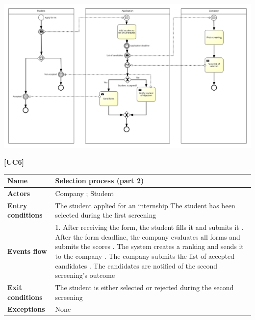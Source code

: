 \documentclass[11pt,twoside]{article}
\begin{document}
\begin{center}
\includegraphics[width=\textwidth]{Images/UC5}
\end{center}

\newpage

\large{\textbf{[UC6]}} \\
\begin{table}[H]
\begin{tabular}{| p{} | p{} |}
\hline
\textbf{Name}
& Selection process (part 2) \\
\hline
\textbf{Actors}
& Company ; Student \\
\hline
\textbf{Entry conditions}
& The student applied for an internship \newline
The student has been selected during the first screening \\
\hline
\textbf{Events flow}
& 1. After receiving the form, the student fills it and submits it \newline
2. After the form deadline, the company evaluates all forms and submits the scores \newline
3. The system creates a ranking and sends it to the company \newline
4. The company submits the list of accepted candidates \newline
5. The candidates are notified of the second screening's outcome \\
\hline
\textbf{Exit conditions}
& The student is either selected or rejected during the second screening \\
\hline
\textbf{Exceptions}
& None \\
\hline
\end{tabular}
\end{table}
\end{document}
